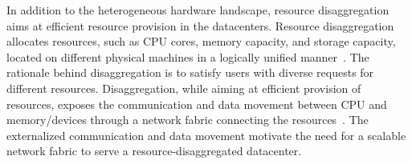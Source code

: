 In addition to the heterogeneous hardware landscape, resource disaggregation aims at efficient resource provision in the datacenters.
%  
Resource disaggregation allocates resources, such as CPU cores, memory capacity, and storage capacity, located on different physical machines in a logically unified manner~\cite{
legoos:osdi:2018, far-memory:eurosys:2020, leap:atc:2020,aifm:osdi:2020,carbink:osdi:2022,hydra:fast:2022}.
%
The rationale behind disaggregation is to satisfy users with diverse requests for different resources.
%
Disaggregation, while aiming at efficient provision of resources, exposes the communication and data movement between CPU and memory/devices through a network fabric connecting the resources~\cite{kona:asplos:2021, intel-cxl:ieee-micro:2023, tpp:asplos:2023, pond:asplos:2023, aurelia:words:2023}.
%
The externalized communication and data movement motivate the need for a scalable network fabric to serve a resource-disaggregated datacenter.
%

%
%
%

